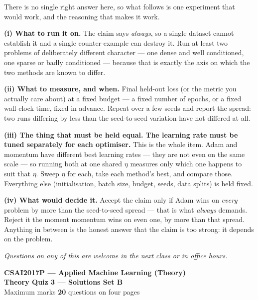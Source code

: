 \documentclass[10pt,a4paper]{article}
\newcommand{\SetLetter}{}
\begin{document}
There is no single right answer here, so what follows is one experiment that would work, and the reasoning that makes it work.\par\vspace{1mm}\textbf{(i) What to run it on.} The claim says \emph{always}, so a single dataset cannot establish it and a single counter-example can destroy it. Run at least two problems of deliberately different character --- one dense and well conditioned, one sparse or badly conditioned --- because that is exactly the axis on which the two methods are known to differ.\par\vspace{1mm}\textbf{(ii) What to measure, and when.} Final held-out loss (or the metric you actually care about) at a fixed budget --- a fixed number of epochs, or a fixed wall-clock time, fixed in advance. Repeat over a few seeds and report the spread: two runs differing by less than the seed-to-seed variation have not differed at all.\par\vspace{1mm}\textbf{(iii) The thing that must be held equal.} \textbf{The learning rate must be tuned separately for each optimiser.} This is the whole item. Adam and momentum have different best learning rates --- they are not even on the same scale --- so running both at one shared $\eta$ measures only which one happens to suit that $\eta$. Sweep $\eta$ for each, take each method's best, and compare those. Everything else (initialisation, batch size, budget, seeds, data splits) is held fixed.\par\vspace{1mm}\textbf{(iv) What would decide it.} Accept the claim only if Adam wins on \emph{every} problem by more than the seed-to-seed spread --- that is what \emph{always} demands. Reject it the moment momentum wins on even one, by more than that spread. Anything in between is the honest answer that the claim is too strong: it depends on the problem.

\vfill

{\footnotesize\itshape Questions on any of this are welcome in the next class or in office hours.}

\newpage


\renewcommand{\SetLetter}{B}\setcounter{page}{1}

\begin{center}
{\large\bfseries CSAI2017P --- Applied Machine Learning (Theory)}\\[2pt]
{\large\bfseries Theory Quiz 3 --- Solutions \quad\textbullet\quad Set B}\\[3pt]
{\small Maximum marks \textbf{20} \quad\textbullet{} questions on four pages}
\end{center}
\vspace{2pt}
\end{document}

